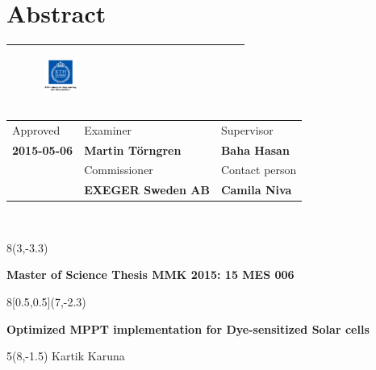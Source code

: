 
\chapter*{Abstract}


\begin{tabular}{ | p{\dimexpr \linewidth-2\tabcolsep} |} \hline
 \begin{figure}[H]
        
        \includegraphics[width=0.2\textwidth]{images/indust} 
             \end{figure}  \\\hline
\end{tabular}   
\begin{tabular}{ | p{} |
                  p{} |
                  p{} |} \hline
                 Approved & Examiner & Supervisor \\
                  \textbf{2015-05-06}  & \textbf{Martin Törngren} & \textbf{Baha Hasan} \\\hline
                   & Commissioner & Contact person \\
                    & \textbf{EXEGER Sweden AB} & \textbf{Camila Niva}\\ \hline
\end{tabular} \\

\begin{textblock}{8}(3,-3.3)
\begin{center}
\textbf{Master of Science Thesis MMK 2015: 15 MES 006 }
\end{center}
\end{textblock}
\begin{textblock}{8}[0.5,0.5](7,-2.3)
\begin{center}
\textbf{Optimized MPPT implementation for Dye-sensitized Solar cells}
\end{center}
\end{textblock}
\begin{textblock}{5}(8,-1.5)
Kartik Karuna
\end{textblock}

